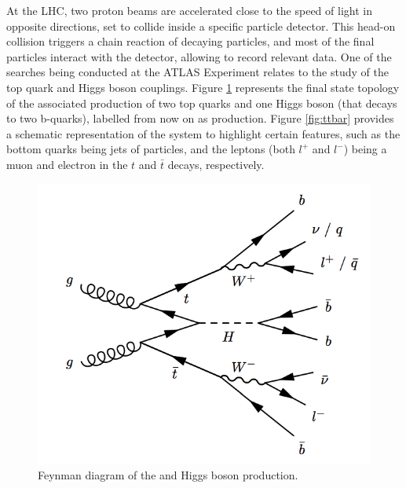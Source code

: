 At the LHC, two proton beams are accelerated close to the speed of light in opposite directions, set to collide inside a specific particle detector. This head-on collision triggers a chain reaction of decaying particles, and most of the final particles interact with the detector, allowing to record relevant data. One of the searches being conducted at the ATLAS Experiment relates to the study of the top quark and Higgs boson couplings. Figure \ref{fig:ttH} represents the final state topology of the associated production of two top quarks and one Higgs boson (that decays to two b-quarks), labelled from now on as \ttH production. Figure \ref{fig:ttbar} provides a schematic representation of the system to highlight certain features, such as the bottom quarks being jets of particles, and the leptons (both $l^+$ and $l^-$) being a muon and electron in the $t$ and $\bar{t}$ decays, respectively.

\begin{figure}[!htp]
	\begin{center}
		\includegraphics[scale=0.3]{imgs/ttH_feynman.png}
		\caption{Feynman diagram of the \ttbar and Higgs boson production.}
		\label{fig:ttH}
	\end{center}
\end{figure}

